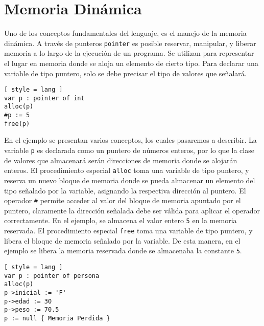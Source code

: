 

\section{Memoria Dinámica}

Uno de los conceptos fundamentales del lenguaje, es el manejo de la memoria dinámica.
A través de punteros \lstinline[style = lang]{pointer} es posible reservar, manipular, y liberar memoria a lo largo de la ejecución de un programa.
Se utilizan para representar el lugar en memoria donde se aloja un elemento de cierto tipo.
Para declarar una variable de tipo puntero, solo se debe precisar el tipo de valores que señalará.

\begin{lstlisting}[ style = lang ]
var p : pointer of int
alloc(p)
#p := 5
free(p)
\end{lstlisting}

En el ejemplo se presentan varios conceptos, los cuales pasaremos a describir.
La variable \lstinline[style = lang]{p} es declarada como un puntero de números enteros, por lo que la clase de valores que almacenará serán direcciones de memoria donde se alojarán enteros.
El procedimiento especial \lstinline[style = lang]{alloc} toma una variable de tipo puntero, y reserva un nuevo bloque de memoria donde se pueda almacenar un elemento del tipo señalado por la variable, asignando la respectiva dirección al puntero.
El operador \lstinline[style = lang]{#} permite acceder al valor del bloque de memoria apuntado por el puntero, claramente la dirección señalada debe ser válida para aplicar el operador correctamente.
En el ejemplo, se almacena el valor entero \lstinline[style = lang]{5} en la memoria reservada.
El procedimiento especial \lstinline[style = lang]{free} toma una variable de tipo puntero, y libera el bloque de memoria señalado por la variable.
De esta manera, en el ejemplo se libera la memoria reservada donde se almacenaba la constante \lstinline[style = lang]{5}.

\begin{lstlisting}[ style = lang ]
var p : pointer of persona
alloc(p)
p->inicial := 'F'
p->edad := 30
p->peso := 70.5
p := null { Memoria Perdida }
\end{lstlisting}

